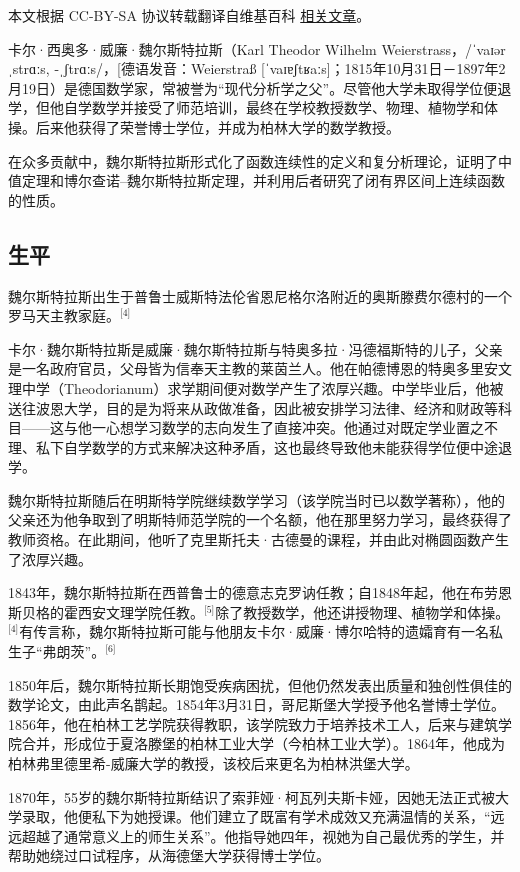 
本文根据 CC-BY-SA 协议转载翻译自维基百科 \href{https://en.wikipedia.org/wiki/Karl_Weierstrass}{相关文章}。

卡尔·西奥多·威廉·魏尔斯特拉斯（Karl Theodor Wilhelm Weierstrass，/ˈvaɪərˌstrɑːs, -ˌʃtrɑːs/，[德语发音：Weierstraß [ˈvaɪɐʃtʁaːs]；1815年10月31日－1897年2月19日）是德国数学家，常被誉为“现代分析学之父”。尽管他大学未取得学位便退学，但他自学数学并接受了师范培训，最终在学校教授数学、物理、植物学和体操。后来他获得了荣誉博士学位，并成为柏林大学的数学教授。

在众多贡献中，魏尔斯特拉斯形式化了函数连续性的定义和复分析理论，证明了中值定理和博尔查诺–魏尔斯特拉斯定理，并利用后者研究了闭有界区间上连续函数的性质。
\subsection{生平}
魏尔斯特拉斯出生于普鲁士威斯特法伦省恩尼格尔洛附近的奥斯滕费尔德村的一个罗马天主教家庭。\(^\text{[4]}\)

卡尔·魏尔斯特拉斯是威廉·魏尔斯特拉斯与特奥多拉·冯德福斯特的儿子，父亲是一名政府官员，父母皆为信奉天主教的莱茵兰人。他在帕德博恩的特奥多里安文理中学（Theodorianum）求学期间便对数学产生了浓厚兴趣。中学毕业后，他被送往波恩大学，目的是为将来从政做准备，因此被安排学习法律、经济和财政等科目——这与他一心想学习数学的志向发生了直接冲突。他通过对既定学业置之不理、私下自学数学的方式来解决这种矛盾，这也最终导致他未能获得学位便中途退学。

魏尔斯特拉斯随后在明斯特学院继续数学学习（该学院当时已以数学著称），他的父亲还为他争取到了明斯特师范学院的一个名额，他在那里努力学习，最终获得了教师资格。在此期间，他听了克里斯托夫·古德曼的课程，并由此对椭圆函数产生了浓厚兴趣。

1843年，魏尔斯特拉斯在西普鲁士的德意志克罗讷任教；自1848年起，他在布劳恩斯贝格的霍西安文理学院任教。\(^\text{[5]}\)除了教授数学，他还讲授物理、植物学和体操。\(^\text{[4]}\)有传言称，魏尔斯特拉斯可能与他朋友卡尔·威廉·博尔哈特的遗孀育有一名私生子“弗朗茨”。\(^\text{[6]}\)

1850年后，魏尔斯特拉斯长期饱受疾病困扰，但他仍然发表出质量和独创性俱佳的数学论文，由此声名鹊起。1854年3月31日，哥尼斯堡大学授予他名誉博士学位。1856年，他在柏林工艺学院获得教职，该学院致力于培养技术工人，后来与建筑学院合并，形成位于夏洛滕堡的柏林工业大学（今柏林工业大学）。1864年，他成为柏林弗里德里希-威廉大学的教授，该校后来更名为柏林洪堡大学。

1870年，55岁的魏尔斯特拉斯结识了索菲娅·柯瓦列夫斯卡娅，因她无法正式被大学录取，他便私下为她授课。他们建立了既富有学术成效又充满温情的关系，“远远超越了通常意义上的师生关系”。他指导她四年，视她为自己最优秀的学生，并帮助她绕过口试程序，从海德堡大学获得博士学位。

